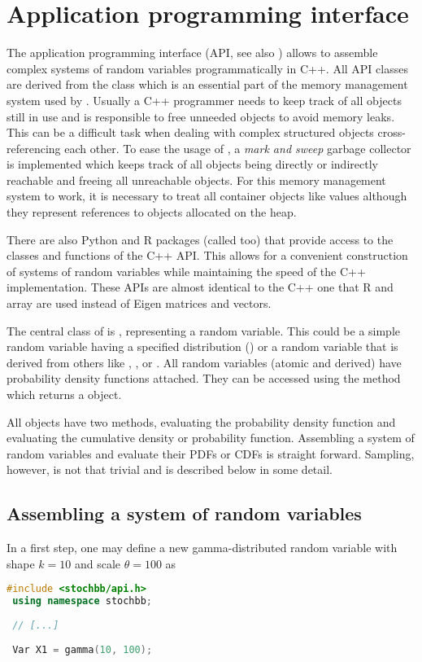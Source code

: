 \section{Application programming interface} \label{sec:api}
The application programming interface (API, see also \cite{stochbbapi}) 
allows to assemble complex systems of random variables programmatically in C++.
All API classes are derived from the  class which is an essential part of the
memory management system used by . Usually a C++ programmer needs to keep track of all
objects still in use and is responsible to free unneeded objects to avoid memory leaks. This can
be a difficult task when dealing with complex structured objects cross-referencing each other.
To ease the usage of , a \emph{mark and sweep} garbage collector is implemented which keeps track
of all objects being directly or indirectly reachable and freeing all unreachable objects. For
this memory management system to work, it is necessary to treat all container objects like values
although they represent references to objects allocated on the heap.

There are also Python and R packages (called  too) that provide access to
the classes and functions of the C++ API. This allows for a convenient construction of systems
of random variables while maintaining the speed of the C++ implementation. These APIs are 
almost identical to the C++ one that R and  array are used instead of Eigen matrices
and vectors.

The central class of  is , representing a random variable. This could be a
simple random variable having a specified distribution () or a random
variable that is derived from others like , ,  or
. All random variables (atomic and derived) have probability density functions
attached. They can be accessed using the  method which returns a 
 object.

All  objects have two methods,  evaluating the probability
density function and  evaluating the cumulative density or probability
function. Assembling a system of random variables and evaluate their PDFs or CDFs is straight
forward. Sampling, however, is not that trivial and is described below in some detail.

\subsection{Assembling a system of random variables}
In a first step, one may define a new gamma-distributed random variable with shape $k=10$
and scale $\theta=100$ as
\begin{lstlisting}[language=C++]
 #include <stochbb/api.h>
 using namespace stochbb;
 
 // [...]
 
 Var X1 = gamma(10, 100);
\end{lstlisting}

